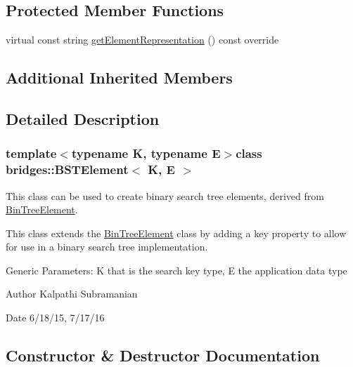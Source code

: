 \subsection*{Protected Member Functions}
\begin{DoxyCompactItemize}
\item 
virtual const string \hyperlink{classbridges_1_1_b_s_t_element_afde56af31362642e6d65bf29f1b056d2}{get\+Element\+Representation} () const  override
\end{DoxyCompactItemize}
\subsection*{Additional Inherited Members}


\subsection{Detailed Description}
\subsubsection*{template$<$typename K, typename E$>$class bridges\+::\+B\+S\+T\+Element$<$ K, E $>$}

This class can be used to create binary search tree elements, derived from \hyperlink{classbridges_1_1_bin_tree_element}{Bin\+Tree\+Element}. 

This class extends the \hyperlink{classbridges_1_1_bin_tree_element}{Bin\+Tree\+Element} class by adding a key property to allow for use in a binary search tree implementation.

Generic Parameters\+: K that is the search key type, E the application data type

\begin{DoxyAuthor}{Author}
Kalpathi Subramanian 
\end{DoxyAuthor}
\begin{DoxyDate}{Date}
6/18/15, 7/17/16 
\end{DoxyDate}


\subsection{Constructor \& Destructor Documentation}
\hypertarget{classbridges_1_1_b_s_t_element_aff7dbbb4011e85ea492d9a0c921895c5}{}
